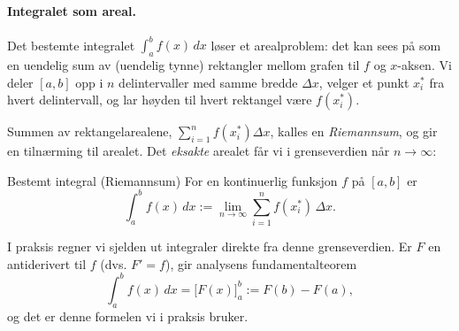\begin{minipage}{7cm}
\paragraph{Integralet som areal.} Det bestemte integralet $\int_a^b f(x)\,dx$ løser et arealproblem: det kan sees på som en uendelig sum av (uendelig tynne) rektangler mellom grafen til $f$ og $x$-aksen. Vi deler $[a,b]$ opp i $n$ delintervaller med samme bredde $\Delta x$, velger et punkt $x_i^*$ fra hvert delintervall, og lar høyden til hvert rektangel være $f(x_i^*)$.
\end{minipage}
\begin{minipage}{6cm}
\end{minipage}

Summen av rektangelarealene, $\sum_{i=1}^n f(x_i^*)\Delta x$, kalles en \emph{Riemannsum}, og gir en tilnærming til arealet. Det \emph{eksakte} arealet får vi i grenseverdien når $n\to\infty$:

\begin{defn}{Bestemt integral (Riemannsum)}
For en kontinuerlig funksjon $f$ på $[a,b]$ er
\[
\int_a^b f(x)\,dx := \lim_{n\to\infty}\sum_{i=1}^n f(x_i^*)\,\Delta x.
\]
\end{defn}

I praksis regner vi sjelden ut integraler direkte fra denne grenseverdien. Er $F$ en antiderivert til $f$ (dvs. $F'=f$), gir analysens fundamentalteorem
\[
\int_a^b f(x)\,dx = \bigl[F(x)\bigr]_a^b := F(b)-F(a),
\]
og det er denne formelen vi i praksis bruker.

